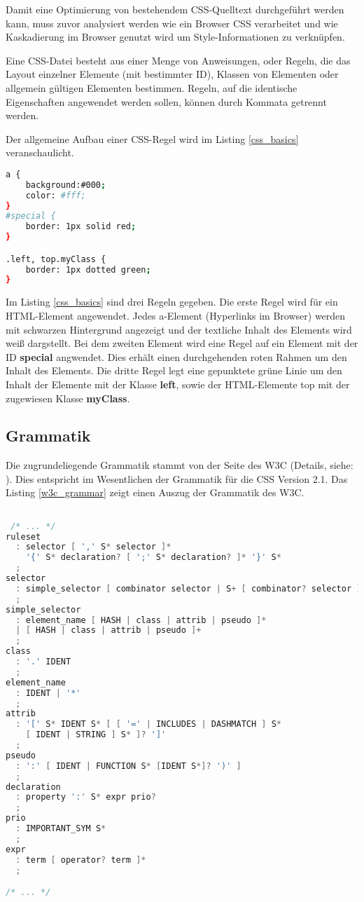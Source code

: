 Damit eine Optimierung von bestehendem CSS-Quelltext durchgeführt werden kann, muss zuvor analysiert werden wie ein Browser CSS verarbeitet und wie Kaskadierung im Browser genutzt wird um Style-Informationen zu verknüpfen.

Eine CSS-Datei besteht aus einer Menge von Anweisungen, oder Regeln, die das Layout einzelner Elemente (mit bestimmter ID), Klassen von Elementen oder allgemein gültigen Elementen bestimmen. Regeln, auf die identische Eigenschaften angewendet werden sollen, können durch Kommata getrennt werden.

Der allgemeine Aufbau einer CSS-Regel wird im Listing \ref{css_basics} veranschaulicht.   

\begin{lstlisting}[label=css_basics,language=bash, caption=Aufbau einer CSS-Regel]
a {
    background:#000;
    color: #fff;
}  
#special {
    border: 1px solid red;
}

.left, top.myClass {
    border: 1px dotted green;
}
\end{lstlisting}

Im Listing \ref{css_basics} sind drei Regeln gegeben. Die erste Regel wird für ein HTML-Element angewendet. Jedes a-Element (Hyperlinks im Browser) werden mit schwarzen Hintergrund angezeigt und der textliche Inhalt des Elements wird weiß dargstellt. Bei dem zweiten Element wird eine Regel auf ein Element mit der ID \textbf{special} angwendet. Dies erhält einen durchgehenden roten Rahmen um den Inhalt des Elements. Die dritte Regel legt eine gepunktete grüne Linie um den Inhalt der Elemente mit der Klasse \textbf{left}, sowie der HTML-Elemente top mit der zugewiesen Klasse \textbf{myClass}.  

\subsection{Grammatik}

Die zugrundeliegende Grammatik stammt von der Seite des W3C (Details, siehe: \cite{w3c_css_grammar}). Dies entspricht im Wesentlichen der Grammatik für die CSS Version 2.1. Das Listing \ref{w3c_grammar} zeigt einen Auszug der Grammatik des W3C. 

\begin{lstlisting}[label=w3c_grammar,language=C, caption=Grammatik des W3C]

 /* ... */
ruleset
  : selector [ ',' S* selector ]*
    '{' S* declaration? [ ';' S* declaration? ]* '}' S*
  ;
selector
  : simple_selector [ combinator selector | S+ [ combinator? selector ]? ]?
  ;
simple_selector
  : element_name [ HASH | class | attrib | pseudo ]*
  | [ HASH | class | attrib | pseudo ]+
  ;
class
  : '.' IDENT
  ;
element_name
  : IDENT | '*'
  ;
attrib
  : '[' S* IDENT S* [ [ '=' | INCLUDES | DASHMATCH ] S*
    [ IDENT | STRING ] S* ]? ']'
  ;
pseudo
  : ':' [ IDENT | FUNCTION S* [IDENT S*]? ')' ]
  ;
declaration
  : property ':' S* expr prio?
  ;
prio
  : IMPORTANT_SYM S*
  ;
expr
  : term [ operator? term ]*
  ;

/* ... */

\end{lstlisting}

